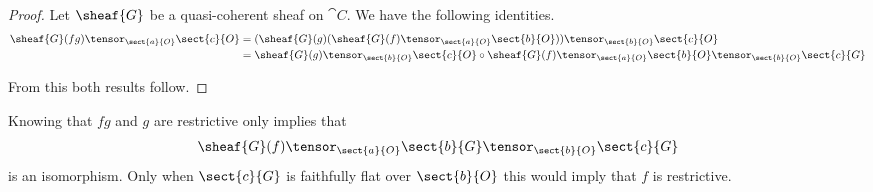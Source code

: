 
\begin{proof}
Let $\sheaf{G}$ be a quasi-coherent sheaf on $\cat{C}$.
We have the following identities.
\begin{align*}
\sheaf{G}(fg)\tensor_{\sect{a}{O}} \sect{c}{O} 
	&=(\sheaf{G}(g)(\sheaf{G}(f)\tensor_{\sect{a}{O}} \sect{b}{O}))\tensor_{\sect{b}{O}} \sect{c}{O}\\
	&= \sheaf{G}(g)\tensor_{\sect{b}{O}} \sect{c}{O} \circ \sheaf{G}(f)\tensor_{\sect{a}{O}} \sect{b}{O}\tensor_{\sect{b}{O}} \sect{c}{G}
\end{align*}

From this both results follow.
\end{proof}

\begin{remark}
Knowing that $fg$ and $g$ are restrictive only implies that
$$\sheaf{G}(f) \tensor_{\sect{a}{O}} \sect{b}{G} \tensor_{\sect{b}{O}} \sect{c}{G}$$
is an isomorphism. 
Only when $\sect{c}{G}$ is faithfully flat over $\sect{b}{O}$ this would imply that $f$ is restrictive.
\end{remark}
